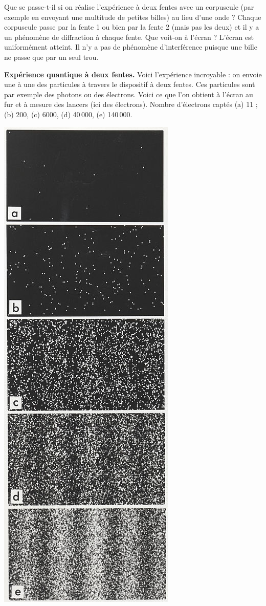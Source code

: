 \documentclass[11pt,class=report,crop=false]{standalone}
\begin{document}
\bigskip

Que se passe-t-il si on réalise l'expérience à deux fentes avec un corpuscule (par exemple en envoyant une multitude de petites billes) au lieu d'une onde ? Chaque corpuscule passe par la fente 1 ou bien par la fente 2 (mais pas les deux) et il y a un phénomène de diffraction à chaque fente. Que voit-on à l'écran ? L'écran est uniformément atteint. Il n'y a pas de phénomène d'interférence puisque une bille ne passe que par un seul trou.


\textbf{Expérience quantique à deux fentes.}
Voici l'expérience incroyable : on envoie une à une des particules à travers le dispositif à deux fentes. Ces particules sont par exemple des photons ou des électrons.
Voici ce que l'on obtient à l'écran au fur et à mesure des lancers (ici des électrons).
Nombre d'électrons captés (a) 11 ; (b) 200, (c) 6000, (d) 40\,000, (e) 140\,000.

\begin{center}
\includegraphics[scale=\myscale,scale=1.2]{figures/fig-interferences}
\end{center}
\end{document}
